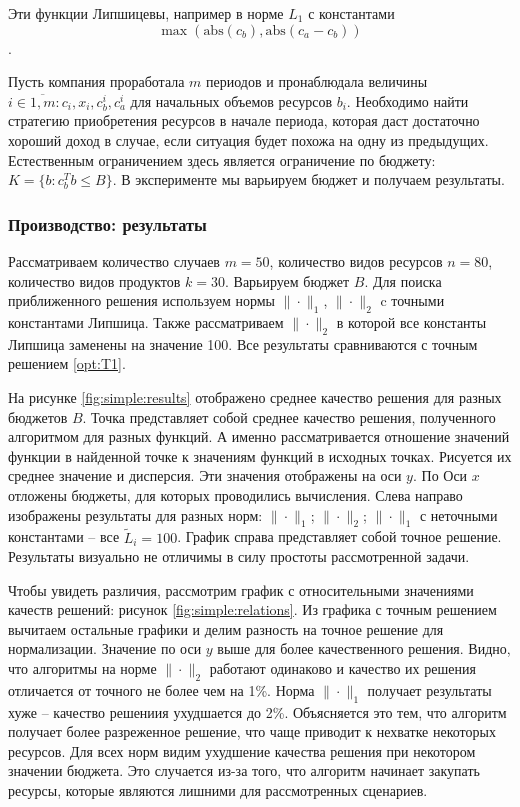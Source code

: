 Эти функции Липшицевы, например в норме  $L_1$ с константами  $$\max(\text{abs} (c_b), \text{abs}(c_a - c_b))$$.

Пусть компания проработала $m$ периодов и пронаблюдала величины $i \in \overline{1, m}: c_i, x_i, c_b^i, c_a^i$ для начальных объемов ресурсов $b_i$.  Необходимо найти стратегию приобретения ресурсов в начале периода, которая даст достаточно хороший доход в случае, если ситуация будет похожа на одну из предыдущих. Естественным ограничением здесь является ограничение по бюджету: $K = \{b: c_b^T b \leq B\}$. В эксперименте мы  варьируем бюджет и получаем результаты. 

\subsubsection{Производство: результаты}
Рассматриваем количество случаев $m=50$, количество видов ресурсов $n = 80$, количество видов продуктов $k = 30$. Варьируем бюджет $B$. Для поиска приближенного решения используем нормы $\|\cdot\|_1$, $\|\cdot\|_2$ c точными константами Липшица. Также рассматриваем $\|\cdot\|_2$ в которой все константы Липшица заменены на значение 100. Все результаты сравниваются с точным решением \ref{opt:T1}.

На рисунке \ref{fig:simple:results} отображено среднее качество решения для разных бюджетов $B$. Точка представляет собой среднее качество решения, полученного алгоритмом для разных функций. А именно рассматривается отношение значений функции в найденной точке к значениям функций в исходных точках. Рисуется их среднее значение и дисперсия. Эти значения отображены на оси $y$. По Оси $x$ отложены бюджеты, для которых проводились вычисления. Слева направо изображены результаты для разных норм:  $\|\cdot\|_1$; $\|\cdot\|_2$; $\|\cdot\|_1$ с неточными константами -- все $ \widetilde{L}_i =100$. График справа представляет собой точное решение. Результаты визуально не отличимы в силу простоты рассмотренной задачи.

Чтобы увидеть различия, рассмотрим график с относительными значениями качеств решений: рисунок \ref{fig:simple:relations}. Из графика с точным решением вычитаем остальные графики и делим разность на точное решение для нормализации. Значение по оси $y$ выше для более качественного решения. Видно, что алгоритмы на норме $\|\cdot\|_2$ работают одинаково и качество их решения отличается от точного не более чем на 1\%. Норма $\|\cdot\|_1$ получает результаты хуже -- качество решениия ухудшается до 2\%. Объясняется это тем, что алгоритм получает более разреженное решение, что чаще приводит к нехватке некоторых ресурсов. Для всех норм видим ухудшение качества решения при некотором значении бюджета. Это случается из-за того, что алгоритм начинает закупать ресурсы, которые являются лишними для рассмотренных сценариев. 

